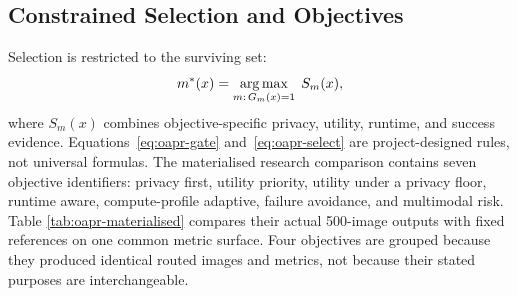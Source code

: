\documentclass[10pt,twocolumn]{IEEEtran}
\begin{document}
\begin{strip}
\begin{minipage}[t]{0.485\textwidth}
\end{minipage}
\hfill
\begin{minipage}[t]{0.485\textwidth}

\subsection{Constrained Selection and Objectives}

Selection is restricted to the surviving set:
\begingroup
\addtolength{\belowdisplayskip}{-2pt}
\begin{equation}
m^{*}(x)=\mathop{\rm arg\,max}_{m:\,G_m(x)=1}\;S_m(x),
\label{eq:oapr-select}
\end{equation}
\endgroup
where $S_m(x)$ combines objective-specific privacy, utility, runtime, and
success evidence. Equations~\ref{eq:oapr-gate} and~\ref{eq:oapr-select} are
project-designed rules, not universal formulas. The materialised research
comparison contains seven objective identifiers:
privacy first, utility priority, utility under a privacy floor, runtime aware,
compute-profile adaptive, failure avoidance, and multimodal risk. Table
\ref{tab:oapr-materialised} compares their actual 500-image outputs with fixed
references on one common metric surface. Four objectives are grouped because
they produced identical routed images and metrics, not because their stated
purposes are interchangeable.
\vspace{2pt}
\end{minipage}

\vspace{3pt}


\end{strip}
\end{document}
